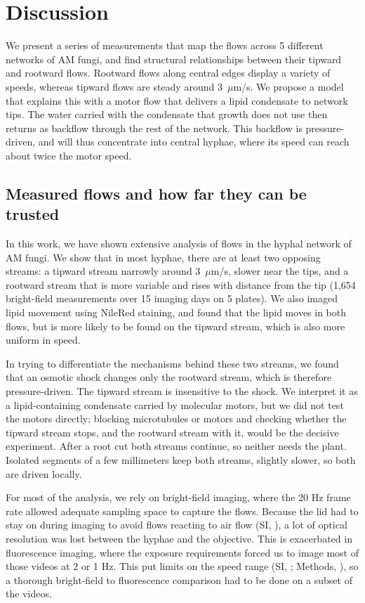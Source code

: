 \section*{Discussion}

We present a series of measurements that map the flows across 5 different networks of AM fungi, and find structural relationships between their tipward and rootward flows.
Rootward flows along central edges display a variety of speeds, whereas tipward flows are steady around 3~$\mu$m/s.
We propose a model that explains this with a motor flow that delivers a lipid condensate to network tips.
The water carried with the condensate that growth does not use then returns as backflow through the rest of the network.
This backflow is pressure-driven, and will thus concentrate into central hyphae, where its speed can reach about twice the motor speed.

\subsection*{Measured flows and how far they can be trusted}
In this work, we have shown extensive analysis of flows in the hyphal network of AM fungi.
We show that in most hyphae, there are at least two opposing streams: a tipward stream narrowly around 3~$\mu$m/s, slower near the tips, and a rootward stream that is more variable and rises with distance from the tip (1,654 bright-field measurements over 15 imaging days on 5 plates).
We also imaged lipid movement using NileRed staining, and found that the lipid moves in both flows, but is more likely to be found on the tipward stream, which is also more uniform in speed.

In trying to differentiate the mechanisms behind these two streams, we found that an osmotic shock changes only the rootward stream, which is therefore pressure-driven.
The tipward stream is insensitive to the shock. We interpret it as a lipid-containing condensate carried by molecular motors, but we did not test the motors directly; blocking microtubules or motors and checking whether the tipward stream stops, and the rootward stream with it, would be the decisive experiment.
After a root cut both streams continue, so neither needs the plant.
Isolated segments of a few millimeters keep both streams, slightly slower, so both are driven locally. 

For most of the analysis, we rely on bright-field imaging, where the 20 Hz frame rate allowed adequate sampling space to capture the flows.
Because the lid had to stay on during imaging to avoid flows reacting to air flow (SI, ), a lot of optical resolution was lost between the hyphae and the objective.
This is exacerbated in fluorescence imaging, where the exposure requirements forced us to image most of those videos at 2 or 1 Hz.
This put limits on the speed range (SI, ; Methods, ), so a thorough bright-field to fluorescence comparison had to be done on a subset of the videos.

